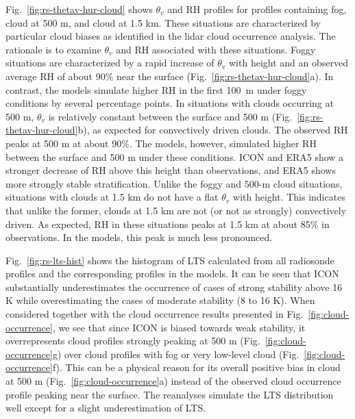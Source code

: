 \documentclass[draft]{agujournal2019}
\begin{document}
Fig.~\ref{fig:rs-thetav-hur-cloud} shows $\theta_v$ and RH profiles for profiles containing fog, cloud at 500 m, and cloud at 1.5 km. These situations are characterized by particular cloud biases as identified in the lidar cloud occurrence analysis. The rationale is to examine $\theta_v$ and RH associated with these situations. Foggy situations are characterized by a rapid increase of $\theta_v$ with height and an observed average RH of about 90\% near the surface (Fig.~\ref{fig:rs-thetav-hur-cloud}a). In contrast, the models simulate higher RH in the first 100~m under foggy conditions by several percentage points. In situations with clouds occurring at 500 m, $\theta_v$ is relatively constant between the surface and 500 m (Fig.~\ref{fig:rs-thetav-hur-cloud}b), as expected for convectively driven clouds. The observed RH peaks at 500 m at about 90\%. The models, however, simulated higher RH between the surface and 500 m under these conditions. ICON and ERA5 show a stronger decrease of RH above this height than observations, and ERA5 shows more strongly stable stratification. Unlike the foggy and 500-m cloud situations, situations with clouds at 1.5 km do not have a flat $\theta_v$ with height. This indicates that unlike the former, clouds at 1.5 km are not (or not as strongly) convectively driven. As expected, RH in these situations peaks at 1.5 km at about 85\% in observations. In the models, this peak is much less pronounced.

Fig.~\ref{fig:rs-lts-hist} shows the histogram of LTS calculated from all radiosonde profiles and the corresponding profiles in the models. It can be seen that ICON substantially underestimates the occurrence of cases of strong stability above 16 K while overestimating the cases of moderate stability (8 to 16 K). When considered together with the cloud occurrence results presented in Fig.~\ref{fig:cloud-occurrence}, we see that since ICON is biased towards weak stability, it overrepresents cloud profiles strongly peaking at 500 m (Fig.~\ref{fig:cloud-occurrence}g) over cloud profiles with fog or very low-level cloud (Fig.~\ref{fig:cloud-occurrence}f). This can be a physical reason for its overall positive bias in cloud at 500 m (Fig.~\ref{fig:cloud-occurrence}a) instead of the observed cloud occurrence profile peaking near the surface. The reanalyses simulate the LTS distribution well except for a slight underestimation of LTS.
\end{document}
